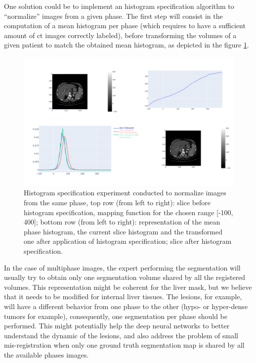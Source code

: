 One solution could be to implement an histogram specification algorithm to ``normalize'' images from a given phase. The first step will consist in the computation of a mean histogram per phase (which requires to have a sufficient amount of \ac{ct} images correctly labeled), before transforming the volumes of a given patient to match the obtained mean histogram, as depicted in the figure \ref{fig:specif}.

\begin{figure}[ht!]
\centering
\includegraphics[width=\linewidth]{../Perspectives/images/image_meta}
\caption{Histogram specification experiment conducted to normalize images from the same phase, top row (from left to right): slice before histogram specification, mapping function for the chosen range [-100, 400]; bottom row (from left to right): representation of the mean phase histogram, the current slice histogram and the transformed one after application of histogram specification; slice after histogram specification.}
\label{fig:specif}
\end{figure}

In the case of multiphase images, the expert performing the segmentation
will usually try to obtain only one segmentation volume shared by all the 
registered volumes. This representation might be coherent for the liver mask, 
but we believe that it needs to be modified for internal liver tissues. 
The lesions, for example, will have a different behavior from one phase to the other
(hypo- or hyper-dense tumors for example), consequently, one segmentation per phase should
be performed. This might potentially help the deep neural
networks to better understand the dynamic of the lesions, and also
address the problem of small mis-registration when only one ground truth
segmentation map is shared by all the available phases images.

